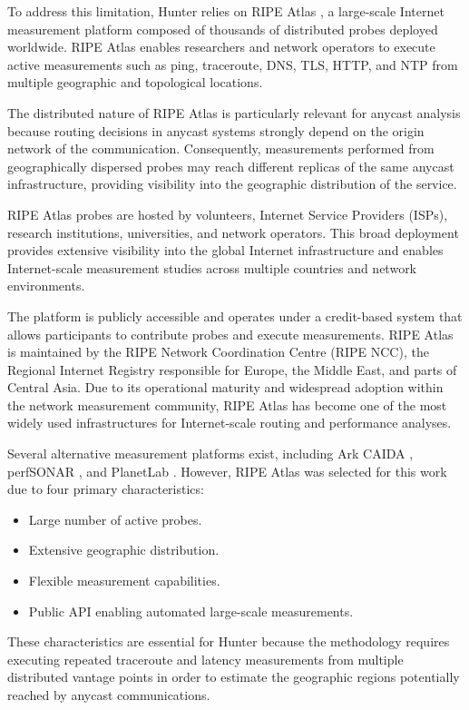 To address this limitation, Hunter relies on RIPE Atlas \cite{HomeAtlas}, a large-scale Internet measurement platform composed of thousands of distributed probes deployed worldwide. RIPE Atlas enables researchers and network operators to execute active measurements such as ping, traceroute, DNS, TLS, HTTP, and NTP from multiple geographic and topological locations.

The distributed nature of RIPE Atlas is particularly relevant for anycast analysis because routing decisions in anycast systems strongly depend on the origin network of the communication. Consequently, measurements performed from geographically dispersed probes may reach different replicas of the same anycast infrastructure, providing visibility into the geographic distribution of the service.

RIPE Atlas probes are hosted by volunteers, Internet Service Providers (ISPs), research institutions, universities, and network operators. This broad deployment provides extensive visibility into the global Internet infrastructure and enables Internet-scale measurement studies across multiple countries and network environments.

The platform is publicly accessible and operates under a credit-based system that allows participants to contribute probes and execute measurements. RIPE Atlas is maintained by the RIPE Network Coordination Centre (RIPE NCC), the Regional Internet Registry responsible for Europe, the Middle East, and parts of Central Asia. Due to its operational maturity and widespread adoption within the network measurement community, RIPE Atlas has become one of the most widely used infrastructures for Internet-scale routing and performance analyses.

Several alternative measurement platforms exist, including Ark CAIDA \cite{ArkCAIDA}, perfSONAR \cite{PerfSONAR}, and PlanetLab \cite{HomePlanetLab}. However, RIPE Atlas was selected for this work due to four primary characteristics:

\begin{itemize}
    \item Large number of active probes.
    \item Extensive geographic distribution.
    \item Flexible measurement capabilities.
    \item Public API enabling automated large-scale measurements.
\end{itemize}

These characteristics are essential for Hunter because the methodology requires executing repeated traceroute and latency measurements from multiple distributed vantage points in order to estimate the geographic regions potentially reached by anycast communications.

